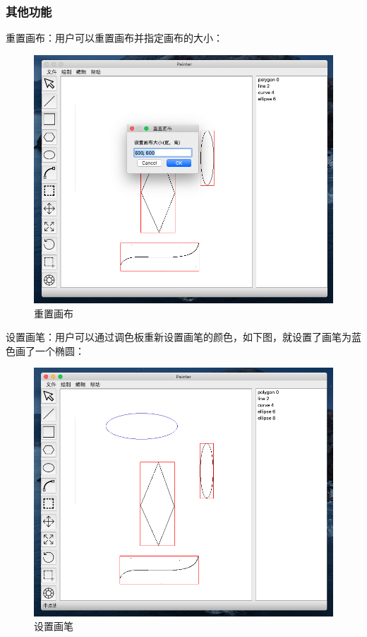 \documentclass[a4paper,UTF8]{article}
\theoremstyle{definition}
\begin{document}
\subsubsection{其他功能}

重置画布：用户可以重置画布并指定画布的大小：

\begin{figure}[H]
    \centering
    \includegraphics[scale=0.5]{reset.png}
    \caption{重置画布}
\end{figure}

设置画笔：用户可以通过调色板重新设置画笔的颜色，如下图，就设置了画笔为蓝色画了一个椭圆：

\begin{figure}[H]
    \centering
    \includegraphics[scale=0.5]{color.png}
    \caption{设置画笔}
\end{figure}
\end{document}
